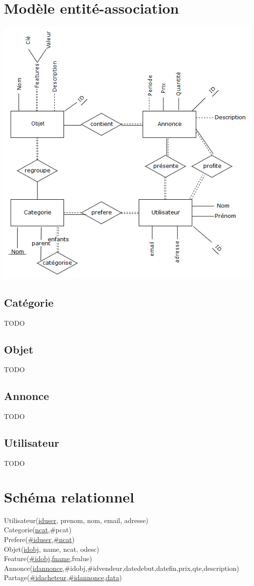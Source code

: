 \documentclass[a4paper,12pt]{article}
\begin{document}
	\begin{spacing}{1}
	\section*{Modèle entité-association}
	\includegraphics[scale=0.6]{modeleEA.png}
	\subsection*{Catégorie}
	TODO
	\subsection*{Objet}
	TODO
	\subsection*{Annonce}
	TODO
	\subsection*{Utilisateur}
	TODO
	\section*{Schéma relationnel}
	Utilisateur(\underline{iduser}, prenom, nom, email, adresse)\\
	Categorie(\underline{ncat},\#pcat)\\
	Prefere(\underline{\#iduser},\underline{\#ncat})\\
	Objet(\underline{idobj}, name, ncat, odesc)\\
	Feature(\underline{\#idobj},\underline{fname},fvalue)\\
	Annonce(\underline{idannonce},\#idobj,\#idvendeur,datedebut,datefin,prix,qte,description)\\
	Partage(\underline{\#idacheteur},\underline{\#idannonce},\underline{data})

\end{spacing}
\end{document}
